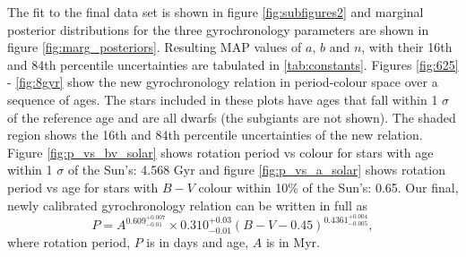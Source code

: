\documentclass[10pt,preprint]{aastex}
\newcommand{\gyroa}{0.310}
\newcommand{\aerrp}{0.03}
\newcommand{\aerrm}{0.01}
\newcommand{\gyron}{0.609}
\newcommand{\nerrp}{0.007}
\newcommand{\nerrm}{0.01}
\newcommand{\gyrob}{0.4361}
\newcommand{\berrp}{0.004}
\newcommand{\berrm}{0.005}
\begin{document}
The fit to the final data set is shown in figure \ref{fig:subfigures2} and marginal posterior distributions for the three gyrochronology parameters are shown in figure \ref{fig:marg_posteriors}.
Resulting MAP values of $a$, $b$ and $n$, with their 16th and 84th percentile uncertainties are tabulated in \ref{tab:constants}.
Figures \ref{fig:625} - \ref{fig:8gyr} show the new gyrochronology relation in period-colour space over a sequence of ages.
The stars included in these plots have ages that fall within 1 $\sigma$ of the reference age and are all dwarfs (the subgiants are not shown).
The shaded region shows the 16th and 84th percentile uncertainties of the new relation.
Figure \ref{fig:p_vs_bv_solar} shows rotation period vs colour for stars with age within 1 $\sigma$ of the Sun's: 4.568 Gyr and figure \ref{fig:p_vs_a_solar} shows rotation period vs age for stars with $B-V$ colour within 10\% of the Sun's: 0.65.
Our final, newly calibrated gyrochronology relation can be written in full as
\begin{equation}
	P = A^{\gyron^{+\nerrp}_{-\nerrm}} \times \gyroa^{+\aerrp}_{-\aerrm}(B-V-0.45)^{\gyrob^{+\berrp}_{-\berrm}},
\label{eq:Barnes2007_2}
\end{equation}
where rotation period, $P$ is in days and age, $A$ is in Myr.
\end{document}
